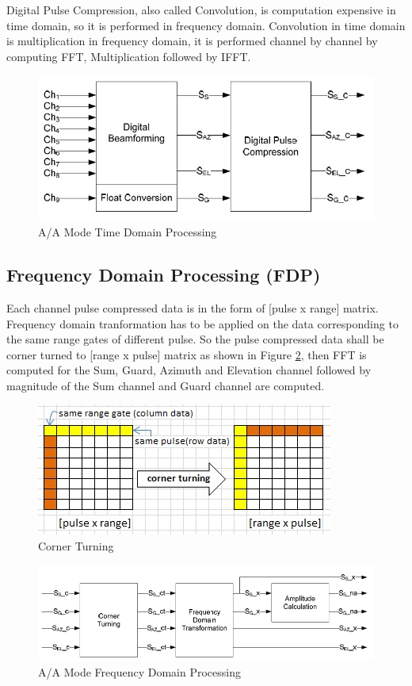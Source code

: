 Digital Pulse Compression, also called Convolution, is computation expensive in time domain, so it is performed in frequency domain. Convolution in time domain is multiplication in frequency domain, it is performed channel by channel by computing FFT, Multiplication followed by IFFT.

\begin{figure}[h!]
	\centering
	\includegraphics[width=120mm]{figures/aa_tdp}
	\caption{A/A Mode Time Domain Processing}
	\label{fig:bg_related_work:aa_tdp}
\end{figure}

\subsection{Frequency Domain Processing (FDP)}
Each channel pulse compressed data is in the form of [pulse x range] matrix. Frequency domain tranformation has to be applied on the data corresponding to the same range gates of different pulse. So the pulse compressed data shall be corner turned to [range x pulse] matrix as shown in Figure \ref{fig:bg_related_work:cot}, then FFT is computed for the Sum, Guard, Azimuth and Elevation channel followed by magnitude of the Sum channel and Guard channel are computed.

\begin{figure}[h!]
	\centering
	\includegraphics[]{figures/cot}
	\caption{Corner Turning}
	\label{fig:bg_related_work:cot}
\end{figure}

\begin{figure}[h!]
	\centering
	\includegraphics[width=140mm]{figures/aa_fdp}
	\caption{A/A Mode Frequency Domain Processing}
	\label{fig:bg_related_work:aa_fdp}
\end{figure}

